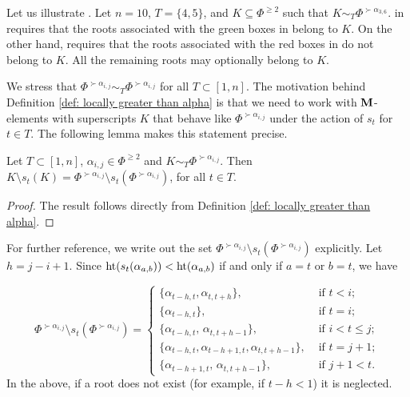 \begin{example}\rm 
Let us illustrate . Let $ n=10 $, $ T=\{4, 5\} $, and $ K \subseteq \Phi^{\geq 2} $ such that $ K \sim_T \Phi^{\succ \alpha_{3,6}} $.  in  requires that the roots associated with the green boxes in  belong to $ K $. On the other hand,  requires that the roots associated with the red boxes in  do not belong to $ K $. All the remaining roots may optionally belong to $K$.



    
\end{example}




   We stress that $\Phi^{\succ \alpha_{i,j}} \sim_T \Phi^{\succ \alpha_{i,j}}  $ for all $T\subset [1,n]$. The motivation behind Definition \ref{def: locally greater than alpha} is that we need to work with $\mathbf{M}$-elements with superscripts $K$ that behave like $\Phi^{\succ \alpha_{i,j}}$ under the action of $s_t$ for $t \in T$. The following lemma makes this statement precise. 
   
\begin{lemma}\rm\label{lem: las que se salen}
    Let $T\subset [1,n]$, $\alpha_{i,j} \in \Phi^{\geq 2}$ and $K\sim_{T} \Phi^{\succ\alpha_{i,j}}$. Then 
     $K\setminus s_t(K) = \Phi^{\succ \alpha_{i,j}} \setminus  s_t(\Phi^{\succ\alpha_{i,j}}) $, for all $t\in T$. 
\end{lemma}
   
\begin{proof}
The result follows directly from Definition \ref{def: locally greater than alpha}. 
\end{proof}

For further reference, we write out the set $\Phi^{\succ \alpha_{i,j}} \setminus  s_t(\Phi^{\succ\alpha_{i,j}})$ explicitly. Let  $h=j-i+1$. Since $\text{ht}(s_t(\alpha_{a,b})) < \text{ht}(\alpha_{a,b})$ if and only if $a=t$ or $b=t$, we have

\begin{equation} \label{eq: las que se salen}
\Phi^{\succ \alpha_{i,j}} \setminus  s_t(\Phi^{\succ\alpha_{i,j}}) =  \left\{ \begin{array}{ll}
    \{  \alpha_{t-h, t} , \alpha_{t,t+h}\} , & \mbox{ if } t < i ; \\
      \{ \alpha_{t-h, t} \} , & \mbox{ if } t= i ; \\
  \{  \alpha_{ t-h,t}, \, \alpha_{t,t+h-1}     \} ,   & \mbox{ if } i < t \leq j ;\\
 \{  \alpha_{t-h, t}, \alpha_{t-h+1, t}, \alpha_{t,t+h-1}   \},    &  \mbox{ if } t=j+1; \\ 
     \{  \alpha_{t-h+1,t}, \, \alpha_{t,t+h-1}  \},    &   \mbox{ if } j+1< t.
 \end{array}  \right.   
\end{equation}  
In the above, if a root does not exist (for example, if $t-h<1$) it is neglected.


